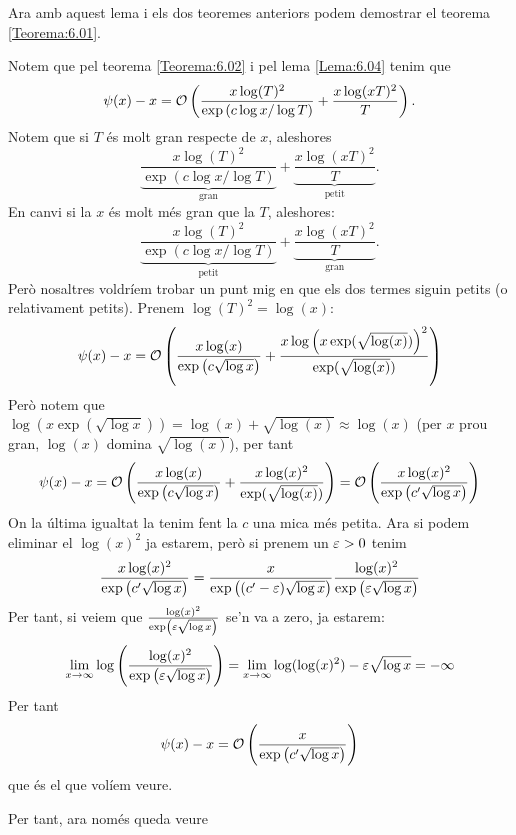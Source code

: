 Ara amb aquest lema i els dos teoremes anteriors podem demostrar el teorema \ref{Teorema:6.01}.
\begin{pf}
    Notem que pel teorema \ref{Teorema:6.02} i pel lema \ref{Lema:6.04} tenim que 
    \[
        \psi(x)-x=
        \mathcal O\left(
        \frac{x\log(T)^2}{\exp\left(c\log x/\log T\right)}
        +
        \frac{x\log(xT)^2}{T}
        \right).
    \]
    Notem que si $T$ és molt gran respecte de $x$, aleshores
    \[
        \underbrace{\frac{x\log(T)^2}{\exp\left(c\log x/\log T\right)}}_{\text{gran}}+
        \underbrace{\frac{x\log(xT)^2}{T}}_{\text{petit}}.
    \]
    En canvi si la $x$ és molt més gran que la $T$, aleshores:
    \[
        \underbrace{\frac{x\log(T)^2}{\exp\left(c\log x/\log T\right)}}_{\text{petit}}+
        \underbrace{\frac{x\log(xT)^2}{T}}_{\text{gran}}.
    \]
    Però nosaltres voldríem trobar un punt mig en que els dos termes siguin petits (o relativament petits). Prenem $\log(T)^2=\log(x)$:
    \[
        \psi(x)-x=
        \mathcal O\left(
        \frac{x\log(x)}{\exp\left(c\sqrt{\log x}\right)}
        +
        \frac{x\log\left(x\exp(\sqrt{\log(x)})\right)^2}{\exp(\sqrt{\log(x)})}
        \right)
    \]
    Però notem que $\log\left(x\exp(\sqrt{\log x})\right)=\log(x)+\sqrt{\log(x)}\approx\log(x)$ (per $x$ prou gran, $\log(x)$ domina $\sqrt{\log(x)}$), per tant
    \[
        \psi(x)-x=
        \mathcal O\left(
        \frac{x\log(x)}{\exp\left(c\sqrt{\log x}\right)}
        +
        \frac{x\log(x)^2}{\exp(\sqrt{\log(x)})}
        \right)=
        \mathcal O\left(
        \frac{x\log(x)^2}{\exp\left(c'\sqrt{\log x}\right)}
        \right)
    \]
    On la última igualtat la tenim fent la $c$ una mica més petita. Ara si podem eliminar el $\log(x)^2$ ja estarem, però si prenem un $\varepsilon>0$ tenim
    \[
        \frac{x\log(x)^2}{\exp\left(c'\sqrt{\log x}\right)}=
        \frac{x}{\exp\left((c'-\varepsilon)\sqrt{\log x}\right)}
        \frac{\log(x)^2}{\exp\left(\varepsilon\sqrt{\log x}\right)}
    \]
    Per tant, si veiem que $\frac{\log(x)^2}{\exp\left(\varepsilon\sqrt{\log x}\right)}$ se'n va a zero, ja estarem:
    \[
        \lim_{x\to\infty}\log\left(\frac{\log(x)^2}{\exp\left(\varepsilon\sqrt{\log x}\right)}\right)=
        \lim_{x\to\infty}\log(\log(x)^2)-
        \varepsilon\sqrt{\log x}=-\infty
    \]
    Per tant
    \[
        \psi(x)-x=\mathcal O\left(\frac{x}{\exp\left(c'\sqrt{\log x}\right)}\right)
    \]
    que és el que volíem veure.
\end{pf}
Per tant, ara només queda veure
